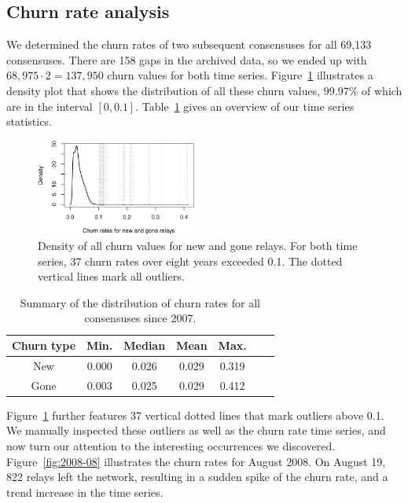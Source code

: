 
\subsection{Churn rate analysis}
We determined the churn rates of two subsequent consensuses for all 69,133
consensuses.  There are 158 gaps in the archived data, so we ended up with
$68,975 \cdot 2 = 137,950$ churn values for both time series.
Figure~\ref{fig:churn-density} illustrates a density plot that shows the
distribution of all these churn values, 99.97\% of which are in the interval
$[0, 0.1]$.  Table~\ref{tab:churn-dist} gives an overview of our time series
statistics.

\begin{figure}[t]
	\centering
	\includegraphics[width=0.47\textwidth]{diagrams/churn-density.pdf}
	\caption{Density of all churn values for new and gone relays.  For both
	time series, 37 churn rates over eight years exceeded 0.1.  The dotted
	vertical lines mark all outliers.}
	\label{fig:churn-density}
\end{figure}

\begin{table}[t]
	\centering
	\begin{tabular}{ccccccc}
	\textbf{Churn type} & \textbf{Min.} & \textbf{Median} & \textbf{Mean} & \textbf{Max.} \\
	\hline
	New & 0.000 & 0.026 & 0.029 & 0.319 \\
	Gone & 0.003 & 0.025 & 0.029 & 0.412 \\
	\end{tabular}
	\caption{Summary of the distribution of churn rates for all consensuses
	since 2007.}
	\label{tab:churn-dist}
\end{table}

Figure~\ref{fig:churn-density} further features 37 vertical dotted lines that
mark outliers above 0.1.  We manually inspected these outliers as well as the
churn rate time series, and now turn our attention to the interesting
occurrences we discovered.  Figure~\ref{fig:2008-08} illustrates the churn rates
for August 2008.  On August 19, 822 relays left the network, resulting in a
sudden spike of the churn rate, and a trend increase in the time series.

